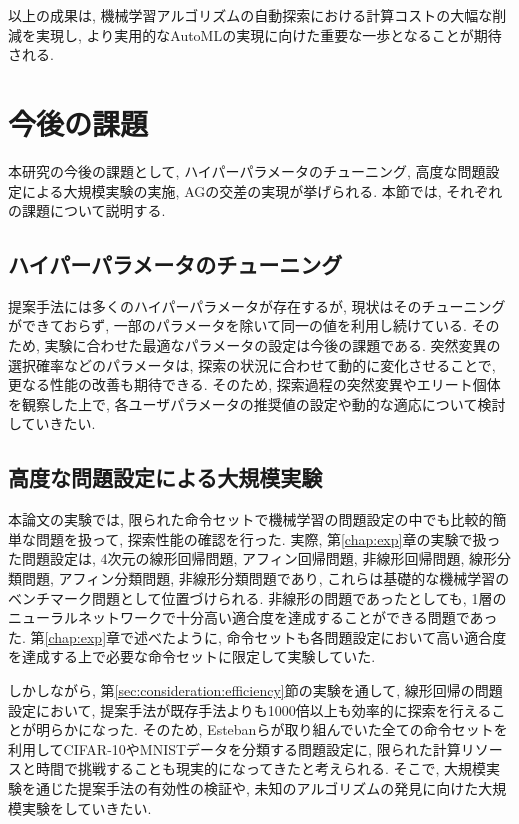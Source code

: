 \documentclass[11pt,oneside,openany,report]{jsbook}
\begin{document}
以上の成果は, 機械学習アルゴリズムの自動探索における計算コストの大幅な削減を実現し, より実用的なAutoMLの実現に向けた重要な一歩となることが期待される.

\section{今後の課題}

本研究の今後の課題として, ハイパーパラメータのチューニング, 高度な問題設定による大規模実験の実施, AGの交差の実現が挙げられる. 本節では, それぞれの課題について説明する.

\subsection{ハイパーパラメータのチューニング}

提案手法には多くのハイパーパラメータが存在するが, 現状はそのチューニングができておらず, 一部のパラメータを除いて同一の値を利用し続けている. そのため, 実験に合わせた最適なパラメータの設定は今後の課題である. 突然変異の選択確率などのパラメータは, 探索の状況に合わせて動的に変化させることで, 更なる性能の改善も期待できる. そのため, 探索過程の突然変異やエリート個体を観察した上で, 各ユーザパラメータの推奨値の設定や動的な適応について検討していきたい.

\subsection{高度な問題設定による大規模実験}

本論文の実験では, 限られた命令セットで機械学習の問題設定の中でも比較的簡単な問題を扱って, 探索性能の確認を行った. 実際, 第\ref{chap:exp}章の実験で扱った問題設定は, 4次元の線形回帰問題, アフィン回帰問題, 非線形回帰問題, 線形分類問題, アフィン分類問題, 非線形分類問題であり, これらは基礎的な機械学習のベンチマーク問題として位置づけられる. 非線形の問題であったとしても, 1層のニューラルネットワークで十分高い適合度を達成することができる問題であった. 第\ref{chap:exp}章で述べたように, 命令セットも各問題設定において高い適合度を達成する上で必要な命令セットに限定して実験していた.

しかしながら, 第\ref{sec:consideration:efficiency}節の実験を通して, 線形回帰の問題設定において, 提案手法が既存手法よりも1000倍以上も効率的に探索を行えることが明らかになった. そのため, Estebanらが取り組んでいた全ての命令セットを利用してCIFAR-10やMNISTデータを分類する問題設定に, 限られた計算リソースと時間で挑戦することも現実的になってきたと考えられる. そこで, 大規模実験を通じた提案手法の有効性の検証や, 未知のアルゴリズムの発見に向けた大規模実験をしていきたい.
\end{document}

